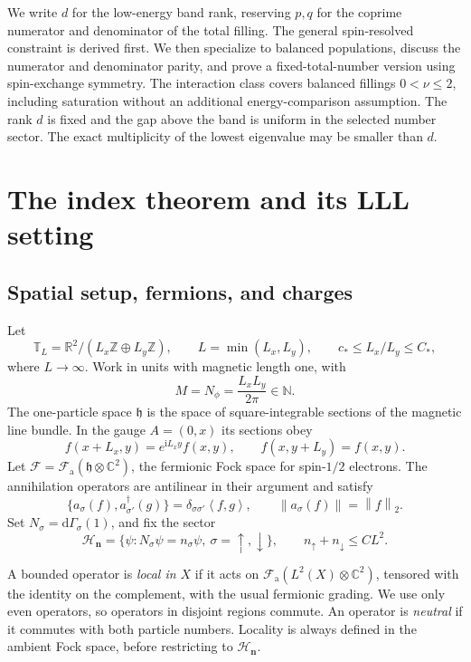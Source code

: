 \documentclass[11pt]{article}
\theoremstyle{definition}
\theoremstyle{remark}
\newcommand{\ii}{\mathrm i}
\newcommand{\dG}{\mathrm d\Gamma}
\newcommand{\HH}{\mathcal H}
\newcommand{\FF}{\mathcal F}
\newcommand{\TT}{\mathbb T}
\newcommand{\up}{\uparrow}
\newcommand{\dn}{\downarrow}
\newcommand{\norm}[1]{\left\lVert#1\right\rVert}
\newcommand{\ip}[2]{\left\langle#1,#2\right\rangle}
\begin{document}
We write \(d\) for the low-energy band rank, reserving \(p,q\)
for the coprime numerator and denominator of the total filling.
The general spin-resolved constraint is derived first.  We then
specialize to balanced populations, discuss the numerator and
denominator parity, and prove a fixed-total-number version using
spin-exchange symmetry.  The interaction class covers balanced
fillings \(0<\nu\le2\), including saturation without an additional
energy-comparison assumption.  The rank \(d\) is fixed and the gap above the
band is uniform in the selected number sector.  The exact multiplicity
of the lowest eigenvalue may be smaller than \(d\).

\section{The index theorem and its LLL setting}

\subsection{Spatial setup, fermions, and charges}

Let
\[
 \TT_L=\mathbb R^2/(L_x\mathbb Z\oplus L_y\mathbb Z),\qquad
 L=\min(L_x,L_y),\qquad
 c_*\le L_x/L_y\le C_*,
\]
where \(L\to\infty\).  Work in units with magnetic length one, with
\[
 M=N_\phi=\frac{L_xL_y}{2\pi}\in\mathbb N.
\]
The one-particle space \(\mathfrak h\) is the space of square-integrable
sections of the magnetic line bundle.  In the gauge \(A=(0,x)\) its
sections obey
\begin{equation}\label{eq:bc}
 f(x+L_x,y)=e^{\ii L_xy}f(x,y),\qquad
 f(x,y+L_y)=f(x,y).
\end{equation}
Let \(\FF=\FF_{\mathrm a}(\mathfrak h\otimes\mathbb C^2)\),
the fermionic Fock space for spin-\(1/2\) electrons.
The annihilation operators are antilinear in their argument and satisfy
\[
 \{a_\sigma(f),a_{\sigma'}^\dagger(g)\}
 =\delta_{\sigma\sigma'}\ip f g,\qquad
 \norm{a_\sigma(f)}=\norm f_2.
\]
Set \(N_\sigma=\dG_\sigma(1)\), and fix the sector
\[
 \HH_{\bm n}=\{\psi:N_\sigma\psi=n_\sigma\psi,\ \sigma=\up,\dn\},
 \qquad n_\up+n_\dn\le C L^2.
\]

A bounded operator is \emph{local in \(X\)} if it acts on
\(\FF_{\mathrm a}(L^2(X)\otimes\mathbb C^2)\), tensored with the
identity on the complement, with the usual fermionic grading.
We use only even operators, so operators in disjoint regions
commute.  An operator is \emph{neutral} if it commutes with both
particle numbers.  Locality is always defined in the ambient Fock
space, before restricting to \(\HH_{\bm n}\).
\end{document}
